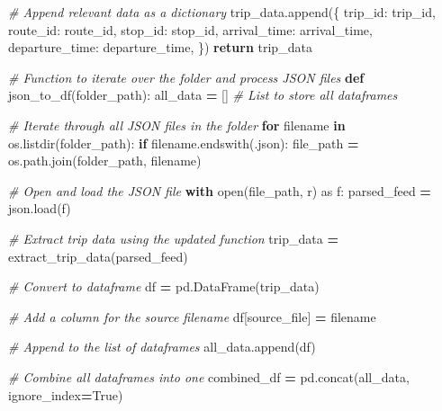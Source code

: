 \documentclass[
  12pt,
]{article}
\newenvironment{Shaded}{\begin{snugshade}}{\end{snugshade}}
\newcommand{\BuiltInTok}[1]{#1}
\newcommand{\CommentTok}[1]{\textcolor[rgb]{0.56,0.35,0.01}{\textit{#1}}}
\newcommand{\ControlFlowTok}[1]{\textcolor[rgb]{0.13,0.29,0.53}{\textbf{#1}}}
\newcommand{\ImportTok}[1]{#1}
\newcommand{\KeywordTok}[1]{\textcolor[rgb]{0.13,0.29,0.53}{\textbf{#1}}}
\newcommand{\NormalTok}[1]{#1}
\newcommand{\OperatorTok}[1]{\textcolor[rgb]{0.81,0.36,0.00}{\textbf{#1}}}
\newcommand{\StringTok}[1]{\textcolor[rgb]{0.31,0.60,0.02}{#1}}
\newcommand{\VariableTok}[1]{\textcolor[rgb]{0.00,0.00,0.00}{#1}}
\begin{document}
\begin{Shaded}
\begin{Highlighting}[]
            \CommentTok{\# Append relevant data as a dictionary}
\NormalTok{            trip\_data.append(\{}
                \StringTok{\textquotesingle{}trip\_id\textquotesingle{}}\NormalTok{: trip\_id,}
                \StringTok{\textquotesingle{}route\_id\textquotesingle{}}\NormalTok{: route\_id,}
                \StringTok{\textquotesingle{}stop\_id\textquotesingle{}}\NormalTok{: stop\_id,}
                \StringTok{\textquotesingle{}arrival\_time\textquotesingle{}}\NormalTok{: arrival\_time,}
                \StringTok{\textquotesingle{}departure\_time\textquotesingle{}}\NormalTok{: departure\_time,}
\NormalTok{            \})}
    \ControlFlowTok{return}\NormalTok{ trip\_data}

\CommentTok{\# Function to iterate over the folder and process JSON files}
\KeywordTok{def}\NormalTok{ json\_to\_df(folder\_path):}
\NormalTok{    all\_data }\OperatorTok{=}\NormalTok{ []  }\CommentTok{\# List to store all dataframes}

    \CommentTok{\# Iterate through all JSON files in the folder}
    \ControlFlowTok{for}\NormalTok{ filename }\KeywordTok{in}\NormalTok{ os.listdir(folder\_path):}
        \ControlFlowTok{if}\NormalTok{ filename.endswith(}\StringTok{\textquotesingle{}.json\textquotesingle{}}\NormalTok{): }
\NormalTok{            file\_path }\OperatorTok{=}\NormalTok{ os.path.join(folder\_path, filename)}

            \CommentTok{\# Open and load the JSON file}
            \ControlFlowTok{with} \BuiltInTok{open}\NormalTok{(file\_path, }\StringTok{\textquotesingle{}r\textquotesingle{}}\NormalTok{) }\ImportTok{as}\NormalTok{ f:}
\NormalTok{                parsed\_feed }\OperatorTok{=}\NormalTok{ json.load(f)}

            \CommentTok{\# Extract trip data using the updated function}
\NormalTok{            trip\_data }\OperatorTok{=}\NormalTok{ extract\_trip\_data(parsed\_feed)}

            \CommentTok{\# Convert to dataframe}
\NormalTok{            df }\OperatorTok{=}\NormalTok{ pd.DataFrame(trip\_data)}

            \CommentTok{\# Add a column for the source filename}
\NormalTok{            df[}\StringTok{\textquotesingle{}source\_file\textquotesingle{}}\NormalTok{] }\OperatorTok{=}\NormalTok{ filename}

            \CommentTok{\# Append to the list of dataframes}
\NormalTok{            all\_data.append(df)}

    \CommentTok{\# Combine all dataframes into one}
\NormalTok{    combined\_df }\OperatorTok{=}\NormalTok{ pd.concat(all\_data, ignore\_index}\OperatorTok{=}\VariableTok{True}\NormalTok{)}


\end{Highlighting}
\end{Shaded}
\end{document}
